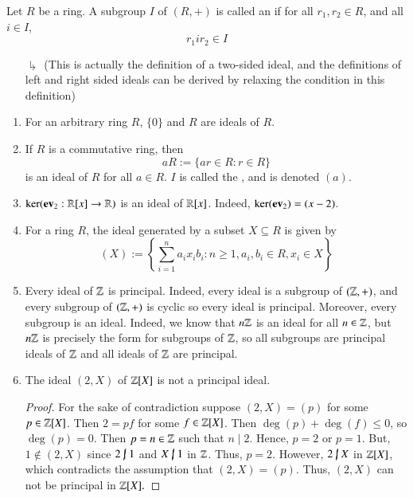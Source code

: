 \documentclass[12pt, a4paper, oneside, openright, titlepage]{book}
\begin{document}
\begin{defn}
    Let $R$ be a ring. A subgroup $I$ of $(R,+)$ is called an  if for all $r_1,r_2 \in R$, and all $i \in I$, \begin{equation}
        r_1ir_2 \in I
    \end{equation}
     \begin{enumerate}
         \item[$\drsh$] (This is actually the definition of a two-sided ideal, and the definitions of left and right sided ideals can be derived by relaxing the condition in this definition) 
     \end{enumerate}
\end{defn}

\begin{eg}
    \leavevmode
    \begin{enumerate}
        \item For an arbitrary ring $R$, $\{0\}$ and $R$ are ideals of $R$.
        \item If $R$ is a commutative ring, then \begin{equation}
            aR := \{ar \in R: r \in R\}
        \end{equation}
        is an ideal of $R$ for all $a \in R$. $I$ is called the , and is denoted $(a)$.
        \item $\ker(\operatorname{\bf{ev}}_2:\mathbb R[x]\rightarrow \mathbb R)$ is an ideal of $\mathbb R[x]$. Indeed, $\ker(\operatorname{\bf{ev}}_2) = (x-2)$.
        \item For a ring $R$, the ideal generated by a subset $X \subseteq R$ is given by \begin{equation}
            (X) := \left\{\sum\limits_{i=1}^na_ix_ib_i: n \geq 1, a_i,b_i \in R, x_i \in X\right\}
        \end{equation}
        \item Every ideal of $\mathbb Z$ is principal. Indeed, every ideal is a subgroup of $(\mathbb Z,+)$, and every subgroup of $(\mathbb Z,+)$ is cyclic so every ideal is principal. Moreover, every subgroup is an ideal. Indeed, we know that $n\mathbb Z$ is an ideal for all $n \in \mathbb Z$, but $n\mathbb Z$ is precisely the form for subgroups of $\mathbb Z$, so all subgroups are principal ideals of $\mathbb Z$ and all ideals of $\mathbb Z$ are principal.
        \item The ideal $(2,X)$ of $\mathbb Z[X]$ is not a principal ideal.
        \begin{proof}
            For the sake of contradiction suppose $(2,X) = (p)$ for some $p \in \mathbb Z[X]$. Then $2 = pf$ for some $f \in \mathbb Z[X]$. Then $\deg(p) + \deg(f) \leq 0$, so $\deg(p) = 0$. Then $p = n \in \mathbb Z$ such that $n\;\vert\;2$. Hence, $p = 2$ or $p = 1$. But, $1 \notin (2,X)$ since $2 \;\cancel{\vert}\;1$ and $X\;\cancel{\vert}\;1$ in $\mathbb Z$. Thus, $p = 2$. However, $2\;\cancel{\vert}\;X$ in $\mathbb Z[X]$, which contradicts the assumption that $(2,X) = (p)$. Thus, $(2,X)$ can not be principal in $\mathbb Z[X].$
        \end{proof}
    \end{enumerate}
\end{eg}
\end{document}
